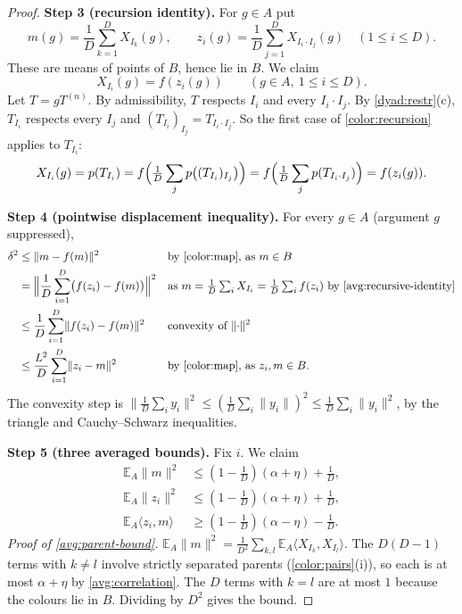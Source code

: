 \documentclass[11pt]{article}
\newcommand{\norm}[1]{\lVert #1\rVert}
\newcommand{\ip}[2]{\langle #1,#2\rangle}
\theoremstyle{definition}
\numberwithin{equation}{section}
\newcommand{\step}[1]{\par\smallskip\noindent\textbf{Step #1.}\enspace}
\newcommand{\EA}{\mathbb E_A}
\begin{document}
\begin{proof}
\step{3 (recursion identity)}
For \(g\in A\) put
\[
  m(g)=\frac1D\sum_{k=1}^D X_{I_k}(g),\qquad
  z_i(g)=\frac1D\sum_{j=1}^D X_{I_i\cdot I_j}(g)
       \quad(1\le i\le D).
\]
These are means of points of \(B\), hence lie in \(B\). We claim
\begin{equation}\label{avg:recursive-identity}
  X_{I_i}(g)=f(z_i(g))\qquad(g\in A,\ 1\le i\le D).
\end{equation}
Let \(T=gT^{(n)}\). By admissibility, \(T\) respects \(I_i\) and every
\(I_i\cdot I_j\). By \cref{dyad:restr}(c), \(T_{I_i}\) respects every
\(I_j\) and \((T_{I_i})_{I_j}=T_{I_i\cdot I_j}\). So the first case of
\eqref{color:recursion} applies to \(T_{I_i}\):
\[
 X_{I_i}(g)=p(T_{I_i})
 =f\Bigl(\tfrac1D\sum_j p\bigl((T_{I_i})_{I_j}\bigr)\Bigr)
 =f\Bigl(\tfrac1D\sum_j p(T_{I_i\cdot I_j})\Bigr)=f(z_i(g)).
\]

\step{4 (pointwise displacement inequality)}
For every \(g\in A\) (argument \(g\) suppressed),
\begin{align}
  \delta^2
  &\le\norm{m-f(m)}^2
   &&\text{by \eqref{color:map}, as \(m\in B\)}\notag\\
  &=\Bigl\|\frac1D\sum_{i=1}^D\bigl(f(z_i)-f(m)\bigr)\Bigr\|^2
   &&\text{as \(m=\tfrac1D\textstyle\sum_iX_{I_i}
      =\tfrac1D\sum_if(z_i)\) by \eqref{avg:recursive-identity}}\notag\\
  &\le\frac1D\sum_{i=1}^D\norm{f(z_i)-f(m)}^2
   &&\text{convexity of \(\norm{\cdot}^2\)}\notag\\
  &\le\frac{L^2}{D}\sum_{i=1}^D\norm{z_i-m}^2
   &&\text{by \eqref{color:map}, as \(z_i,m\in B\)}.
       \label{avg:displacement}
\end{align}
The convexity step is \(\norm{\frac1D\sum_iy_i}^2\le
(\frac1D\sum_i\norm{y_i})^2\le\frac1D\sum_i\norm{y_i}^2\), by the triangle
and Cauchy--Schwarz inequalities.

\step{5 (three averaged bounds)}
Fix \(i\). We claim
\begin{align}
  \EA\norm{m}^2
       &\le\left(1-\frac1D\right)(\alpha+\eta)+\frac1D,
       \label{avg:parent-bound}\\
  \EA\norm{z_i}^2
       &\le\left(1-\frac1D\right)(\alpha+\eta)+\frac1D,
       \label{avg:child-bound}\\
  \EA\ip{z_i}{m}
    &\ge\left(1-\frac1D\right)(\alpha-\eta)-\frac1D.
       \label{avg:mixed-bound}
\end{align}
\emph{Proof of \eqref{avg:parent-bound}.}
\(\EA\norm m^2=\frac1{D^2}\sum_{k,l}\EA\ip{X_{I_k}}{X_{I_l}}\).
The \(D(D-1)\) terms with \(k\ne l\) involve strictly separated parents
(\cref{color:pairs}(i)), so each is at most \(\alpha+\eta\) by
\eqref{avg:correlation}. The \(D\) terms with \(k=l\) are at most \(1\)
because the colours lie in \(B\). Dividing by \(D^2\) gives the bound.


\end{proof}
\end{document}
